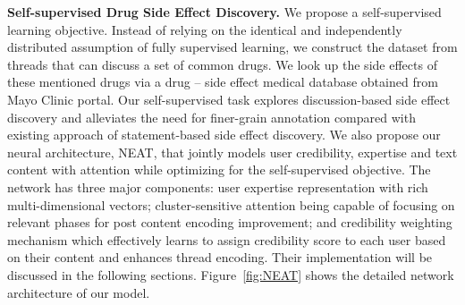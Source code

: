 \documentclass{bmcart}
\begin{document}



{\bf Self-supervised Drug Side Effect Discovery.} We propose a self-supervised learning objective. Instead of relying on the identical and independently distributed assumption of fully supervised learning, we construct the dataset from threads that can discuss a set of common drugs. We look up the side effects of these mentioned drugs via a drug -- side effect medical database obtained from Mayo Clinic portal. Our self-supervised task explores discussion-based side effect discovery and alleviates the need for finer-grain annotation compared with existing approach of statement-based side effect discovery.
We also propose our neural architecture, NEAT, that jointly models user credibility, expertise and text content with attention while optimizing for the self-supervised objective.
The network has three major components: user expertise representation with rich multi-dimensional vectors; cluster-sensitive attention being capable of focusing on relevant phases for post content encoding improvement; and credibility weighting mechanism which effectively learns to assign credibility score to each user based on their content and enhances thread encoding. Their implementation will be discussed in the following sections. Figure~\ref{fig:NEAT} shows the detailed network architecture of our model. \\
\end{document}
